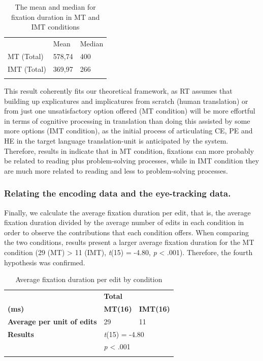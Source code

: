 \documentclass[output=paper]{langsci/langscibook}
\begin{document}
\begin{table}
\begin{tabular}{lll}
\lsptoprule
\hhline{~--} & Mean & Median\\
MT (Total) & 578,74 & 400\\
IMT (Total) & 369,97 & 266\\
\lspbottomrule
\end{tabular}
\caption{The mean and median for fixation duration in MT and IMT conditions}
\label{tab:4}
\end{table}


This result coherently fits our theoretical framework, as RT assumes that building up explicatures and implicatures from scratch (human translation) or from just one unsatisfactory option offered (MT condition) will be more effortful in terms of cognitive processing in translation than doing this assisted by some more options (IMT condition), as the initial process of articulating CE, PE and HE in the target language translation-unit is anticipated by the system. Therefore, results in  indicate that in MT condition, fixations can more probably be related to reading plus problem-solving processes, while in IMT condition they are much more related to reading and less to problem-solving processes.


\subsubsection{Relating the encoding data and the eye-tracking data.}

Finally, we calculate the average fixation duration per edit, that is, the average fixation duration divided by the average number of edits in each condition in order to observe the contributions that each condition offers. When comparing the two conditions, results present a larger average fixation duration for the MT condition                 (29 (MT) {\textgreater} 11 (IMT), \textit{t}(15) = -4.80, \textit{p} {\textless} .001). Therefore, the fourth hypothesis was confirmed.

\begin{table}
\begin{tabular}{lll}
\lsptoprule
\hhline{~--} & \multicolumn{2}{l}{\bfseries                  Total}\\
\bfseries (ms) & {\bfseries MT(16)} & \bfseries IMT(16)\\
\bfseries Average per unit of edits & {29} & 11\\
\bfseries Results & \multicolumn{2}{l}{\textit{t}(15) = -4.80}\\
& \multicolumn{2}{l}{ \textit{p} {\textless} .001}\\
\hhline{~--}
\lspbottomrule
\end{tabular}
\caption{Average fixation duration per edit by condition}
\label{tab:5}
\end{table}
\end{document}
